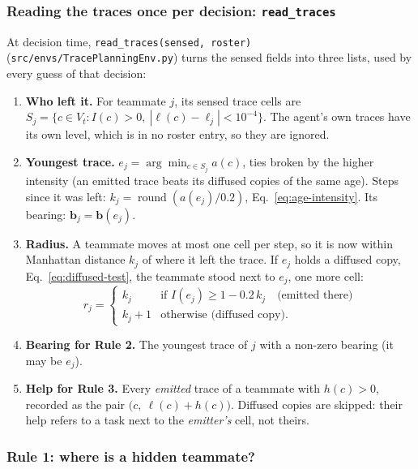 \documentclass[11pt,a4paper]{article}
\newcommand{\file}{\nolinkurl}  %
\newcommand{\code}[1]{\texttt{#1}}
\theoremstyle{remark}
\begin{document}
\subsubsection{Reading the traces once per decision: \code{read\_traces}}

At decision time, \code{read\_traces(sensed, roster)} (\file{src/envs/TracePlanningEnv.py}) turns the sensed fields into
three lists, used by every guess of that decision:
\begin{enumerate}[nosep]
  \item \textbf{Who left it.} For teammate $j$, its sensed trace cells are $S_j=\{c \in V_t : I(c)>0,\ |\ell(c)-\ell_j|
        < 10^{-4}\}$. The agent's own traces have its own level, which is in no roster entry, so they are ignored.
  \item \textbf{Youngest trace.} $e_j = \arg\min_{c\in S_j} a(c)$, ties broken by the higher intensity (an emitted trace
        beats its diffused copies of the same age). Steps since it was left: $k_j = \operatorname{round}(a(e_j)/0.2)$,
        Eq.~\eqref{eq:age-intensity}. Its bearing: $\mathbf b_j = \mathbf b(e_j)$.
  \item \textbf{Radius.} A teammate moves at most one cell per step, so it is now within Manhattan distance $k_j$ of
        where it left the trace. If $e_j$ holds a diffused copy, Eq.~\eqref{eq:diffused-test}, the teammate stood next to
        $e_j$, one more cell:
        \begin{equation}
          r_j = \begin{cases} k_j & \text{if } I(e_j) \ge 1 - 0.2\,k_j \quad\text{(emitted there)}\\
                              k_j + 1 & \text{otherwise (diffused copy).}\end{cases}
          \label{eq:radius}
        \end{equation}
  \item \textbf{Bearing for Rule 2.} The youngest trace of $j$ with a non-zero bearing (it may be $e_j$).
  \item \textbf{Help for Rule 3.} Every \emph{emitted} trace of a teammate with $h(c)>0$, recorded as the pair
        $\bigl(c,\ \ell(c)+h(c)\bigr)$. Diffused copies are skipped: their help refers to a task next to the
        \emph{emitter's} cell, not theirs.
\end{enumerate}

\subsubsection{Rule 1: where is a hidden teammate?}
\end{document}
